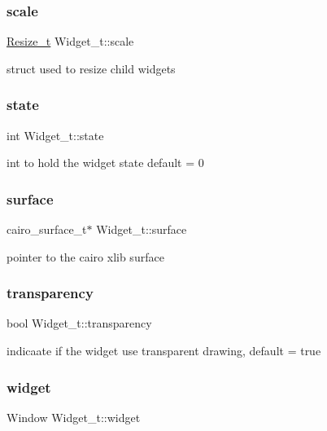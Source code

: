 \subsubsection{\texorpdfstring{scale}{scale}}
{\footnotesize\ttfamily \hyperlink{structResize__t}{Resize\+\_\+t} Widget\+\_\+t\+::scale}

struct used to resize child widgets \mbox{\label{structWidget__t_aaa935b64805fdeb78acb015c67d6638c}} 
\subsubsection{\texorpdfstring{state}{state}}
{\footnotesize\ttfamily int Widget\+\_\+t\+::state}

int to hold the widget state default = 0 \mbox{\label{structWidget__t_ae9b5979742ea31817ff7d7b34a56f88d}} 
\subsubsection{\texorpdfstring{surface}{surface}}
{\footnotesize\ttfamily cairo\+\_\+surface\+\_\+t$\ast$ Widget\+\_\+t\+::surface}

pointer to the cairo xlib surface \mbox{\label{structWidget__t_a42a597c21eca964c0296fc7026feb43b}} 
\subsubsection{\texorpdfstring{transparency}{transparency}}
{\footnotesize\ttfamily bool Widget\+\_\+t\+::transparency}

indicaate if the widget use transparent drawing, default = true \mbox{\label{structWidget__t_acb2bfb41674371ee1220a9d6a2d89fb1}} 
\subsubsection{\texorpdfstring{widget}{widget}}
{\footnotesize\ttfamily Window Widget\+\_\+t\+::widget}

